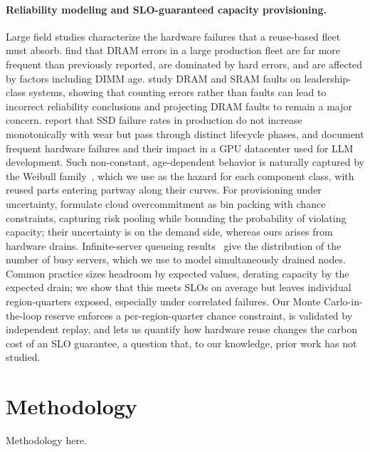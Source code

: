 \documentclass{article} %
\begin{document}
\paragraph{Reliability modeling and SLO-guaranteed capacity provisioning.}
Large field studies characterize the hardware failures that a reuse-based fleet must absorb. \citet{Schroeder2009DramErrors} find that DRAM errors in a large production fleet are far more frequent than previously reported, are dominated by hard errors, and are affected by factors including DIMM age. \citet{Sridharan2015MemoryErrors} study DRAM and SRAM faults on leadership-class systems, showing that counting errors rather than faults can lead to incorrect reliability conclusions and projecting DRAM faults to remain a major concern. \citet{Meza2015LargescaleFlash} report that SSD failure rates in production do not increase monotonically with wear but pass through distinct lifecycle phases, and \citet{Hu2024CharacterizationLarge} document frequent hardware failures and their impact in a GPU datacenter used for LLM development. Such non-constant, age-dependent behavior is naturally captured by the Weibull family~\citep{Weibull1951StatisticalDistribution}, which we use as the hazard for each component class, with reused parts entering partway along their curves. For provisioning under uncertainty, \citet{Cohen2017OvercommitmentCloud} formulate cloud overcommitment as bin packing with chance constraints, capturing risk pooling while bounding the probability of violating capacity; their uncertainty is on the demand side, whereas ours arises from hardware drains. Infinite-server queueing results~\citep{Eick1993PhysicsMtg} give the distribution of the number of busy servers, which we use to model simultaneously drained nodes. Common practice sizes headroom by expected values, derating capacity by the expected drain; we show that this meets SLOs on average but leaves individual region-quarters exposed, especially under correlated failures. Our Monte Carlo-in-the-loop reserve enforces a per-region-quarter chance constraint, is validated by independent replay, and lets us quantify how hardware reuse changes the carbon cost of an SLO guarantee, a question that, to our knowledge, prior work has not studied.

\section{Methodology}
\label{sec:method}
Methodology here.
\end{document}
